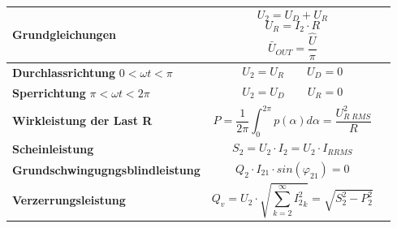 \begin{longtable}{| p{} | p{} | p{} |} %
    \hline
    \textbf{Grundgleichungen}&
    \[ U_2 = U_D + U_R \]
    \[ U_R = I_2 \cdot R\]
    \[ \bar{U}_{OUT} = \dfrac{\hat{U}}{\pi}\]&\\
    \hline
    \textbf{Durchlassrichtung}\newline
    $ 0 < \omega t < \pi $&
    \[ U_2 = U_R \qquad U_D = 0 \]&\\
    \hline   
    \textbf{Sperrichtung}\newline
    $ \pi < \omega t < 2\pi $&
    \[ U_2=U_D \qquad U_R = 0 \]&\\
    \hline
    
    \textbf{Wirkleistung der Last R}&
    \[ P=\frac{1}{2\pi} \int_{0}^{2\pi} p(\alpha) d\alpha = \dfrac{U_{R\;RMS}^2}{R} \]&
    \\ \hline
    
    \textbf{Scheinleistung}&
    \[ S_2 = U_2 \cdot I_2 = U_2 \cdot I_{R RMS} \]&
    \\ \hline
        
    \textbf{Grundschwingugngsblindleistung}&
    \[ Q_2\cdot I_{2 1} \cdot sin(\varphi_{2 1}) = 0 \]&
    \\ \hline    
    
        
    \textbf{Verzerrungsleistung}&
    \[ Q_v = U_2 \cdot \sqrt{\sum_{k=2}^{\infty} {I_2^2}_k} = \sqrt{S_2^2 - P_2^2} \]&
    \\ \hline

\end{longtable}

